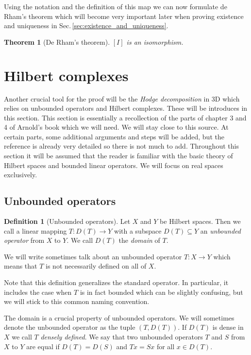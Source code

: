 \documentclass[12pt,a4paper]{article}
\numberwithin{equation}{subsection}
\numberwithin{lemma}{subsection}
\newtheorem{theorem}[lemma]{Theorem}
\theoremstyle{definition}
\newtheorem{definition}[lemma]{Definition}
\begin{document}
Using the notation and the definition of this map we can now formulate 
de Rham's theorem which will become very important later when proving
existence and uniqueness in Sec.\,\ref{sec:existence_and_uniqueness}.
\begin{theorem}[De Rham's theorem]
    $[I]$ is an isomorphism.
\end{theorem}

\section{Hilbert complexes}

Another crucial tool for the proof will be the \textit{Hodge decomposition} 
in 3D which relies on unbounded operators and Hilbert complexes. These 
will be introduces in this section. This section is essentially a 
recollection of the parts of chapter 3 and 4 of Arnold's book \cite{arnold}
which we will need. We will stay close to this source. At certain parts, 
some additional arguments and steps will be added, but the reference is 
already very detailed so there is not much to add. Throughout this section 
it will be assumed that the reader is familiar with the basic theory of 
Hilbert spaces and bounded linear operators. We will focus on real spaces 
exclusively.

\subsection{Unbounded operators}\label{sec:unbounded_operators}

\begin{definition}[Unbounded operators]
    Let $X$ and $Y$ be Hilbert spaces. Then we call a linear mapping 
    $T: D(T) \rightarrow Y$ with a subspace $D(T) \subseteq Y$ an 
    \textit{unbounded 
    operator} from $X$ to $Y$. We call $D(T)$ the \textit{domain} of $T$.
\end{definition}
We will write sometimes talk about an unbounded operator $T:X \rightarrow Y$ 
which means that $T$ is not necessarily defined on all of $X$. 

Note that this definition generalizes the standard operator. In particular, 
it includes the case when $T$ is in fact bounded which can be 
slightly confusing, but we will stick to this common naming convention. 

The domain is a crucial property of unbounded operators. We will sometimes 
denote the unbounded operator as the tuple $(T,D(T))$.
If $D(T)$ is dense in $X$ we call $T$ \textit{densely defined}. 
We say that two unbounded operators $T$ and $S$ from $X$ to $Y$ are equal 
if $D(T) = D(S)$ and $Tx = Sx$ for all $x\in D(T)$.
\end{document}
